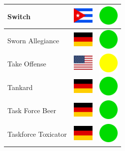 \documentclass[12pt, a4paper, twoside]{report}
\begin{document}
\begin{center}
\begin{longtable}{|p{5cm}|p{2cm}|p{2cm}|}
 Switch                                                     & \includegraphics[width=1cm]{../4x3/cu} &   \includegraphics[width=1cm]{../likes/y} \\ \hline
 Sworn Allegiance                                           & \includegraphics[width=1cm]{../4x3/de} &   \includegraphics[width=1cm]{../likes/y} \\ \hline
 Take Offense                                               & \includegraphics[width=1cm]{../4x3/us} &   \includegraphics[width=1cm]{../likes/m} \\ \hline
 Tankard                                                    & \includegraphics[width=1cm]{../4x3/de} &   \includegraphics[width=1cm]{../likes/y} \\ \hline
 Task Force Beer                                            & \includegraphics[width=1cm]{../4x3/de} &   \includegraphics[width=1cm]{../likes/y} \\ \hline
 Taskforce Toxicator                                        & \includegraphics[width=1cm]{../4x3/de} &   \includegraphics[width=1cm]{../likes/y} \\ \hline

\end{longtable}
\end{center}
\end{document}
